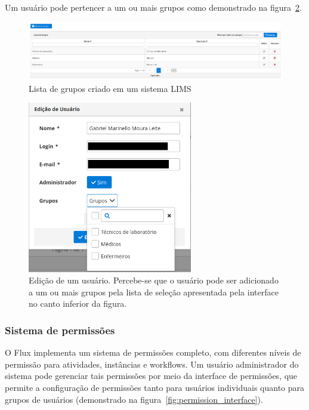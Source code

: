 Um usuário pode pertencer a um ou mais grupos como demonstrado na figura~\ref{fig:user_edit}.

\begin{figure}
    \centering
    \includegraphics[width=\textwidth]{imgs/Flux/Grupos/listaDeGrupos.png}
    \caption{Lista de grupos criado em um sistema LIMS}
    \label{fig:groups_list}
\end{figure}

\begin{figure}
    \centering
    \includegraphics[width=\textwidth, height=7.5cm, keepaspectratio]{imgs/Flux/Usuarios/edicaoUsuario.png}
    \caption{Edição de um usuário. Percebe-se que o usuário pode ser adicionado a um ou mais grupos pela lista de seleção apresentada pela interface no canto inferior da figura.}
    \label{fig:user_edit}
\end{figure}

\subsubsection{Sistema de permissões}

O Flux implementa um sistema de permissões completo, com diferentes níveis de permissão para atividades, instâncias e workflows.
Um usuário administrador do sistema pode gerenciar tais permissões por meio da interface de permissões, que permite a configuração de permissões tanto para usuários individuais quanto para grupos de usuários (demonstrado na figura~\ref{fig:permission_interface}).

